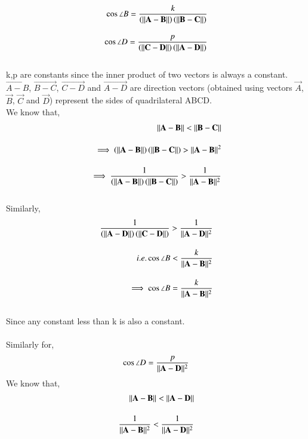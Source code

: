 \documentclass[journal,12pt,twocolumn]{IEEEtran}
\begin{document}
\begin{align}
\cos{\angle B} = \frac{k}{\left(\lVert\mathbf{A-B}\rVert\right)\left(\lVert\mathbf{B-C}\rVert\right)}\\[1em]
\cos{\angle D} = \frac{p}{\left(\lVert\mathbf{C-D}\rVert\right)\left(\lVert\mathbf{A-D}\rVert\right)}  
\end{align}\\
k,p are constants since the inner product of two vectors is always a constant. $\vec{A-B}$, $\vec{B-C}$, $\vec{C-D}$ and $\vec{A-D}$ are direction vectors (obtained using vectors $\vec{A}$, $\vec{B}$, $\vec{C}$ and $\vec{D}$) represent the sides of quadrilateral ABCD.\\
We know that,
\begin{align}
\lVert\mathbf{A-B}\rVert < \lVert\mathbf{B-C}\rVert\\[1em]
\implies \left(\lVert\mathbf{A-B}\rVert\right)\left(\lVert\mathbf{B-C}\rVert\right) > \lVert\mathbf{A-B}\rVert^2\\[1em]
\implies \frac{1}{\left(\lVert\mathbf{A-B}\rVert\right)\left(\lVert\mathbf{B-C}\rVert\right)} > \frac{1}{\lVert\mathbf{A-B}\rVert^2}
\end{align}\\
Similarly, 
\begin{align}
\frac{1}{\left(\lVert\mathbf{A-D}\rVert\right)\left(\lVert\mathbf{C-D}\rVert\right)} > \frac{1}{\lVert\mathbf{A-D}\rVert^2}\\[1em]   
i.e. \cos{\angle B} < \frac{k}{{\lVert\mathbf{A-B}\rVert^2}}\\[1em]
\implies \cos{\angle B} = \frac{k}{{\lVert\mathbf{A-B}\rVert^2}}
\end{align}\\
Since any constant less than k is also a constant.\\\\
Similarly for,
\begin{align}
\cos{\angle D} = \frac{p}{{\lVert\mathbf{A-D}\rVert^2}}
\end{align}
We know that,
\begin{align}
{\lVert\mathbf{A-B}\rVert} < {\lVert\mathbf{A-D}\rVert}\\[1em]
\frac{1}{\lVert\mathbf{A-B}\rVert^2} < \frac{1}{\lVert\mathbf{A-D}\rVert^2}
\end{align}
\end{document}
